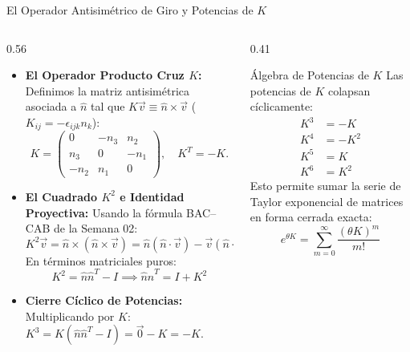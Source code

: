 \documentclass[10pt,aspectratio=169]{beamer}
\begin{document}
\begin{frame}{El Operador Antisimétrico de Giro y Potencias de $K$}
  \begin{columns}[c]
    \begin{column}{0.56\textwidth}
      \footnotesize
      \begin{itemize}\itemsep2pt
        \item \textbf{El Operador Producto Cruz $K$:}
        Definimos la matriz antisimétrica asociada a $\hat{n}$ tal que $K\vec{v} \equiv \hat{n} \times \vec{v}$ ($K_{ij} = -\epsilon_{ijk} n_k$):
        \[
        K = \begin{pmatrix} 0 & -n_3 & n_2 \\ n_3 & 0 & -n_1 \\ -n_2 & n_1 & 0 \end{pmatrix}, \quad K^T = -K.
        \]
        \item \textbf{El Cuadrado $K^2$ e Identidad Proyectiva:}
        Usando la fórmula BAC--CAB de la Semana 02:
        \[
        K^2\vec{v} = \hat{n} \times (\hat{n} \times \vec{v}) = \hat{n}(\hat{n}\cdot\vec{v}) - \vec{v}(\hat{n}\cdot\hat{n}) = \hat{n}(\hat{n}\cdot\vec{v}) - \vec{v}.
        \]
        En términos matriciales puros:
        \[
        K^2 = \hat{n}\hat{n}^T - I \implies \boxed{\hat{n}\hat{n}^T = I + K^2}
        \]
        \item \textbf{Cierre Cíclico de Potencias:}
        Multiplicando por $K$: $K^3 = K(\hat{n}\hat{n}^T - I) = \vec{0} - K = -K$.
      \end{itemize}
    \end{column}
    \begin{column}{0.41\textwidth}
      \footnotesize
      \begin{block}{Álgebra de Potencias de $K$}
        \scriptsize
        Las potencias de $K$ colapsan cíclicamente:
        \begin{align*}
          K^3 &= -K \\
          K^4 &= -K^2 \\
          K^5 &= K \\
          K^6 &= K^2
        \end{align*}
        Esto permite sumar la serie de Taylor exponencial de matrices en forma cerrada exacta:
        \[
        e^{\theta K} = \sum_{m=0}^\infty \frac{(\theta K)^m}{m!}
        \]
      \end{block}
    \end{column}
  \end{columns}
\end{frame}
\end{document}

